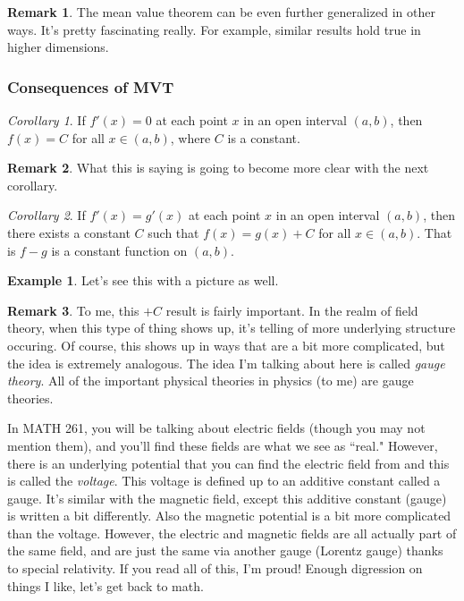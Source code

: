 \documentclass[leqno]{article}
\theoremstyle{definition}
\newtheorem{remark}{Remark}[section]
\newtheorem{example}{Example}[section]
\theoremstyle{remark}
\theoremstyle{theorem}
\newtheorem{corollary}{Corollary}[section]
\begin{document}
\begin{remark}
The mean value theorem can be even further generalized in other ways.  It's pretty fascinating really. For example, similar results hold true in higher dimensions. 
\end{remark}

\subsubsection{Consequences of MVT}

\begin{corollary}
If $f'(x)=0$ at each point $x$ in an open interval $(a,b)$, then $f(x)=C$ for all $x\in (a,b)$, where $C$ is a constant.
\end{corollary}

\begin{remark}
What this is saying is going to become more clear with the next corollary.
\end{remark}

\begin{corollary}
If $f'(x)=g'(x)$ at each point $x$ in an open interval $(a,b)$, then there exists a constant $C$ such that $f(x)=g(x)+C$ for all $x\in (a,b)$. That is $f-g$ is a constant function on $(a,b)$.  
\end{corollary}

\begin{example}
Let's see this with a picture as well. 
\vspace*{6cm}\\
\end{example}

\begin{remark}
To me, this $+C$ result is fairly important.  In the realm of field theory, when this type of thing shows up, it's telling of more underlying structure occuring.  Of course, this shows up in ways that are a bit more complicated, but the idea is extremely analogous. The idea I'm talking about here is called \emph{gauge theory}.  All of the important physical theories in physics (to me) are gauge theories.  

In MATH 261, you will be talking about electric fields (though you may not mention them), and you'll find these fields are what we see as ``real." However, there is an underlying potential that you can find the electric field from and this is called the \emph{voltage}. This voltage is defined up to an additive constant called a gauge.  It's similar with the magnetic field, except this additive constant (gauge) is written a bit differently. Also the magnetic potential is a bit more complicated than the voltage. However, the electric and magnetic fields are all actually part of the same field, and are just the same via another gauge (Lorentz gauge) thanks to special relativity.  If you read all of this, I'm proud! Enough digression on things I like, let's get back to math.
\end{remark}
\end{document}
